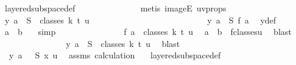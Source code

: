 \begin{isabellebody}
\ layered{\isacharunderscore}{\kern0pt}subspace{\isacharunderscore}{\kern0pt}def\ \isanewline
\ \ \ \ \ \ \ \ \ \ \ \ \isamarkupfalse%
\ {\isacharparenleft}{\kern0pt}metis\ imageE\ uv{\isacharunderscore}{\kern0pt}props{\isacharparenright}{\kern0pt}\isanewline
\ \ \ \ \ \ \ \ \ \ \isamarkupfalse%
\ \isamarkupfalse%
\ {\isachardoublequoteopen}y\ a\ {\isasymin}\ S\ {\isacharbackquote}{\kern0pt}\ classes\ k\ t\ u{\isachardoublequoteclose}\ \isanewline
\ \ \ \ \ \ \ \ \ \ \isamarkupfalse%
\ {\isacharminus}{\kern0pt}\isanewline
\ \ \ \ \ \ \ \ \ \ \ \ \isamarkupfalse%
\ {\isachardoublequoteopen}y\ a\ {\isacharequal}{\kern0pt}\ S\ {\isacharparenleft}{\kern0pt}{\isacharquery}{\kern0pt}f\ a{\isacharparenright}{\kern0pt}{\isachardoublequoteclose}\ \isamarkupfalse%
\ y{\isacharunderscore}{\kern0pt}def\ \isamarkupfalse%
\ {\isacartoucheopen}a\ {\isacharless}{\kern0pt}\ b{\isacartoucheclose}\ {}\ \isamarkupfalse%
\ simp\isanewline
\ \ \ \ \ \ \ \ \ \ \ \ \isamarkupfalse%
\ \isamarkupfalse%
\ {\isachardoublequoteopen}{\isacharquery}{\kern0pt}f\ a\ {\isasymin}\ classes\ k\ t\ u{\isachardoublequoteclose}\ \isamarkupfalse%
\ {\isacartoucheopen}a\ {\isacharless}{\kern0pt}\ b{\isacartoucheclose}\ {}\ f{\isacharunderscore}{\kern0pt}classes{\isacharunderscore}{\kern0pt}u\ \isamarkupfalse%
\ blast\isanewline
\ \ \ \ \ \ \ \ \ \ \ \ \isamarkupfalse%
\ \isamarkupfalse%
\ {\isachardoublequoteopen}y\ a\ {\isasymin}\ S\ {\isacharbackquote}{\kern0pt}\ classes\ k\ t\ u{\isachardoublequoteclose}\ \isamarkupfalse%
\ blast\isanewline
\ \ \ \ \ \ \ \ \ \ \isamarkupfalse%
\isanewline
\ \ \ \ \ \ \ \ \ \ \isamarkupfalse%
\ \isamarkupfalse%
\ {\isachardoublequoteopen}{\isasymchi}\ {\isacharparenleft}{\kern0pt}y\ a{\isacharparenright}{\kern0pt}\ {\isacharequal}{\kern0pt}\ {\isasymchi}\ {\isacharparenleft}{\kern0pt}S\ {\isacharparenleft}{\kern0pt}x\ u{\isacharparenright}{\kern0pt}{\isacharparenright}{\kern0pt}{\isachardoublequoteclose}\ \isamarkupfalse%
\ assms{\isacharparenleft}{\kern0pt}{}{\isacharparenright}{\kern0pt}\ calculation{\isacharparenleft}{\kern0pt}{}{\isacharcomma}{\kern0pt}\ {}{\isacharparenright}{\kern0pt}\ \isamarkupfalse%
\ layered{\isacharunderscore}{\kern0pt}subspace{\isacharunderscore}{\kern0pt}def\ \isanewline

\end{isabellebody}
